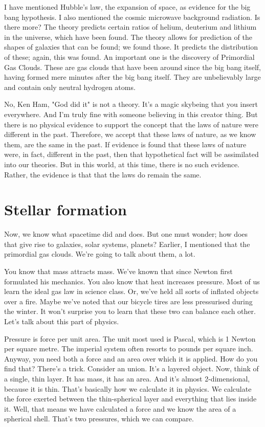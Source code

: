\begin{multicols}{2}
I have mentioned Hubble's law, the expansion of space, as evidence for the big bang hypothesis. I also mentioned the cosmic microwave background radiation. Is there more? The theory predicts certain ratios of helium, deuterium and lithium in the universe, which have been found. The theory allows for prediction of the shapes of galaxies that can be found; we found those. It predicts the distribution of these; again, this was found. An important one is the discovery of Primordial Gas Clouds. These are gas clouds that have been around since the big bang itself, having formed mere minutes after the big bang itself. They are unbelievably large and contain only neutral hydrogen atoms.

No, Ken Ham, "God did it" is not a theory. It's a magic skybeing that you insert everywhere. And I'm truly fine with someone believing in this creator thing. But there is no physical evidence to support the concept that the laws of nature were different in the past. Therefore, we accept that these laws of nature, as we know them, are the same in the past. If evidence is found that these laws of nature were, in fact, different in the past, then that hypothetical fact will be assimilated into our theories. But in this world, at this time, there is no such evidence. Rather, the evidence is that that the laws do remain the same.

\section{Stellar formation}
Now, we know what spacetime did and does. But one must wonder; how does that give rise to galaxies, solar systems, planets? Earlier, I mentioned that the primordial gas clouds. We're going to talk about them, a lot.

You know that mass attracts mass. We've known that since Newton first formulated his mechanics. You also know that heat increases pressure. Most of us learn the ideal gas law in science class. Or, we've held all sorts of inflated objects over a fire. Maybe we've noted that our bicycle tires are less pressurised during the winter. It won't surprise you to learn that these two can balance each other. Let's talk about this part of physics.

Pressure is force per unit area. The unit most used is Pascal, which is 1 Newton per square metre. The imperial system often resorts to pounds per square inch. Anyway, you need both a force and an area over which it is applied. How do you find that? There's a trick. Consider an union. It's a layered object. Now, think of a single, thin layer. It has mass, it has an area. And it's almost 2-dimensional, because it is thin. That's basically how we calculate it in physics. We calculate the force exerted between the thin-spherical layer and everything that lies inside it. Well, that means we have calculated a force and we know the area of a spherical shell. That's two pressures, which we can compare.


\end{multicols}
